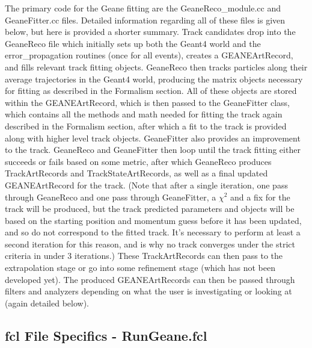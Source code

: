 \documentclass{article}
\begin{document}
    The primary code for the Geane fitting are the GeaneReco\_module.cc and GeaneFitter.cc files. Detailed information regarding all of these files is given below, but here is provided a shorter summary. Track candidates drop into the GeaneReco file which initially sets up both the Geant4 world and the error\_propagation routines (once for all events), creates a GEANEArtRecord, and fills relevant track fitting objects. GeaneReco then tracks particles along their average trajectories in the Geant4 world, producing the matrix objects necessary for fitting as described in the Formalism section. All of these objects are stored within the GEANEArtRecord, which is then passed to the GeaneFitter class, which contains all the methods and math needed for fitting the track again described in the Formalism section, after which a fit to the track is provided along with higher level track objects. GeaneFitter also provides an improvement to the track. GeaneReco and GeaneFitter then loop until the track fitting either succeeds or fails based on some metric, after which GeaneReco produces TrackArtRecords and TrackStateArtRecords, as well as a final updated GEANEArtRecord for the track. (Note that after a single iteration, one pass through GeaneReco and one pass through GeaneFitter, a $\chi^{2}$ and a fix for the track will be produced, but the track predicted parameters and objects will be based on the starting position and momentum guess before it has been updated, and so do not correspond to the fitted track. It's necessary to perform at least a second iteration for this reason, and is why no track converges under the strict criteria in under 3 iterations.) These TrackArtRecords can then pass to the extrapolation stage or go into some refinement stage (which has not been developed yet). The produced GEANEArtRecords can then be passed through filters and analyzers depending on what the user is investigating or looking at (again detailed below).


  \subsection{fcl File Specifics - RunGeane.fcl} 
\end{document}
